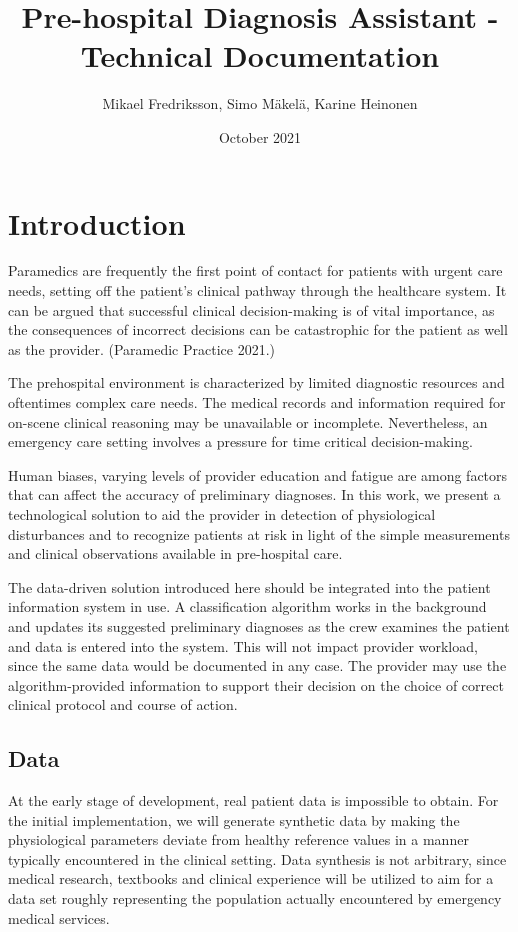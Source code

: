 \documentclass{article}
\title{Pre-hospital Diagnosis Assistant - Technical Documentation}
\author{Mikael Fredriksson, Simo M{\"a}kel{\"a}, Karine Heinonen}
\date{October 2021}
\begin{document}
\maketitle

\section{Introduction}
Paramedics are frequently the first point of contact for patients with urgent care needs, setting off the patient's clinical pathway through the healthcare system. It can be argued that successful clinical decision-making is of vital importance, as the consequences of incorrect decisions can be catastrophic for the patient as well as the provider. (Paramedic Practice 2021.)

The prehospital environment is characterized by limited diagnostic resources and oftentimes complex care needs. The medical records and information required for on-scene clinical reasoning may be unavailable or incomplete. Nevertheless, an emergency care setting involves a pressure for time critical decision-making.

Human biases, varying levels of provider education and fatigue are among factors that can affect the accuracy of preliminary diagnoses. In this work, we present a technological solution to aid the provider in detection of physiological disturbances and to recognize patients at risk in light of the simple measurements and clinical observations available in pre-hospital care.

The data-driven solution introduced here should be integrated into the patient information system in use. A classification algorithm works in the background and updates its suggested preliminary diagnoses as the crew examines the patient and data is entered into the system. This will not impact provider workload, since the same data would be documented in any case. The provider may use the algorithm-provided information to support their decision on the choice of correct clinical protocol and course of action.

\subsection{Data}

At the early stage of development, real patient data is impossible to obtain. For the initial implementation, we will generate synthetic data by making the physiological parameters deviate from healthy reference values in a manner typically encountered in the clinical setting. Data synthesis is not arbitrary, since medical research, textbooks and clinical experience will be utilized to aim for a data set roughly representing the population actually encountered by emergency medical services.
\end{document}
